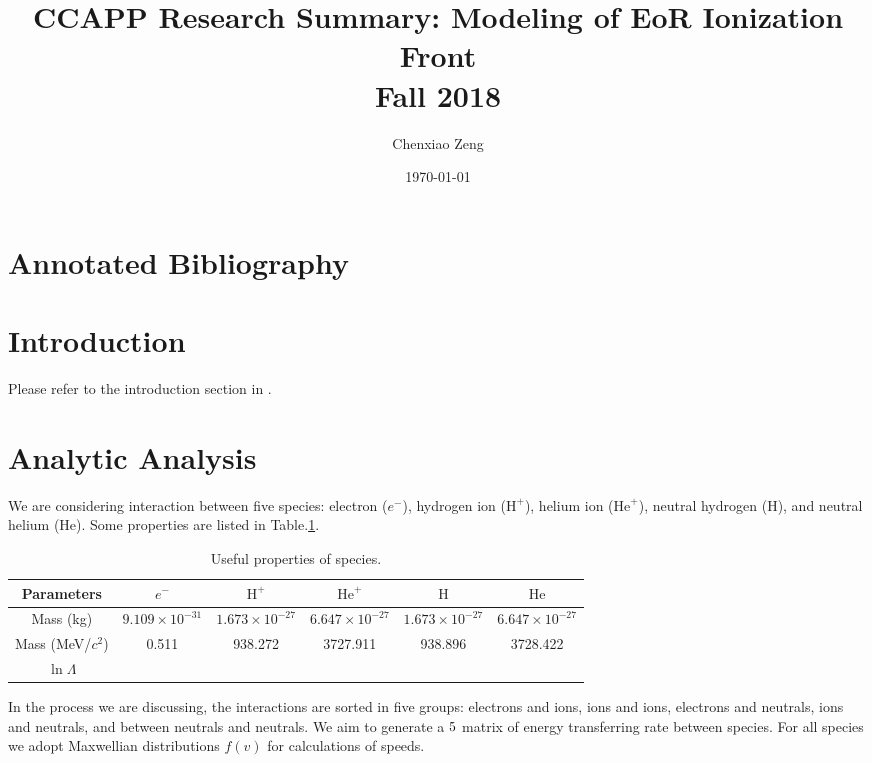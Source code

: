 \documentclass{article}
\author{Chenxiao Zeng}
\date{\today}
\title{\textbf{CCAPP Research Summary: Modeling of EoR Ionization Front}\\\vspace{20pt}Fall 2018}
\begin{document}
	
\maketitle
\tableofcontents

\section{Annotated Bibliography}

\section{Introduction}
Please refer to the introduction section in \cite{Hirata:2018ss}.
\section{Analytic Analysis}
We are considering interaction between five species: electron ($e^-$), hydrogen ion ($\text{H}^+$), helium ion ($\text{He}^+$), neutral hydrogen ($\text{H}$), and neutral helium ($\text{He}$).
Some properties are listed in Table.\ref{species_properties}.

\begin{table}[ht]
\begin{center}
\caption{Useful properties of species.}
\label{species_properties}
\begin{tabular}{cccccc} \hline \hline
\multicolumn{1}{c}{Parameters}&  \multicolumn{1}{c}{$e^-$} & \multicolumn{1}{c}{$\text{H}^+$} & \multicolumn{1}{c}{$\text{He}^+$} & \multicolumn{1}{c}{$\text{H}$} & \multicolumn{1}{c}{$\text{He}$}\\
\hline
Mass (kg) & $9.109 \times 10^{-31}$ & $1.673 \times 10^{-27}$ & $6.647 \times 10^{-27}$  & $1.673 \times 10^{-27}$ & $6.647 \times 10^{-27}$ \\
Mass (MeV/$c^2$) & 0.511 & 938.272 & 3727.911 & 938.896 & 3728.422\\
$\ln \Lambda$ &  &  &  &  & \\
\hline \hline
\end{tabular}
\end{center}
\end{table}

In the process we are discussing, the interactions are sorted in five groups: electrons and ions, ions and ions, electrons and neutrals, ions and neutrals, and between neutrals and neutrals. We aim to generate a $5\time5$ matrix of energy transferring rate between species. For all species we adopt Maxwellian distributions $f(v)$ for calculations of speeds.
\end{document}
